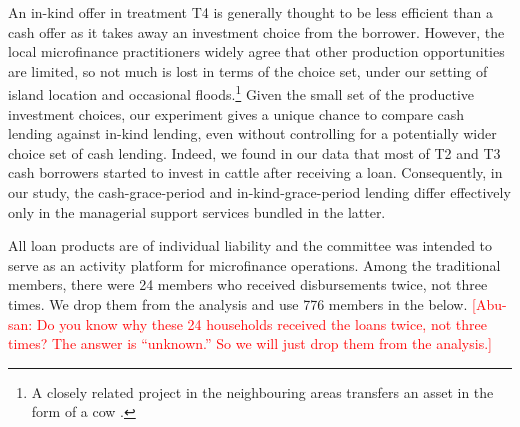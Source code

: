 	An in-kind offer in treatment \textsf{T4} is generally thought to be less efficient than a cash offer as it takes away an investment choice from the borrower. However, the local microfinance practitioners widely agree that other production opportunities are limited, so not much is lost in terms of the choice set, under our setting of island location and occasional floods.\footnote{A closely related project in the neighbouring areas transfers an asset in the form of a cow \citep{BandieraBRAC2017}. }  Given the small set of the productive investment choices, our experiment gives a unique chance to compare cash lending against in-kind lending, even without controlling for a potentially wider choice set of cash lending. 
	Indeed, we found in our data that most of \textsf{T2} and \textsf{T3} cash borrowers started to invest in cattle after receiving a loan. Consequently, in our study, the cash-grace-period and in-kind-grace-period lending differ effectively only in the managerial support services bundled in the latter. 

	All loan products are of individual liability and the committee was intended to serve as an activity platform for microfinance operations. Among the \textsf{traditional} members, there were 24 members who received disbursements twice, not three times. We drop them from the analysis and use 776 members in the below. \textcolor{red}{[Abu-san: Do you know why these 24 households received the loans twice, not three times? The answer is ``unknown.'' So we will just drop them from the analysis.]}



